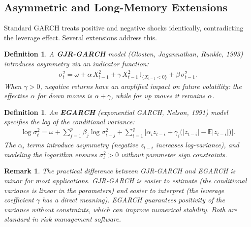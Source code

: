 \documentclass{report}
\theoremstyle{spacedplain}
\theoremstyle{spaceddefinition}
\newtheorem{definition}[theorem]{Definition}
\theoremstyle{spacedremark}
\newtheorem{remark}[theorem]{Remark}
\begin{document}
\subsection{Asymmetric and Long-Memory Extensions}

Standard GARCH treats positive and negative shocks identically, contradicting the leverage effect. Several extensions address this.

\begin{definition}
A \textbf{GJR-GARCH} model (Glosten, Jagannathan, Runkle, 1993) introduces asymmetry via an indicator function:
\begin{align}
    \sigma_t^2 = \omega + \alpha\, X_{t-1}^2 + \gamma\, X_{t-1}^2\, \mathbb{I}_{\{X_{t-1} < 0\}} + \beta\, \sigma_{t-1}^2.
\end{align}
When $\gamma > 0$, negative returns have an amplified impact on future volatility: the effective $\alpha$ for down moves is $\alpha + \gamma$, while for up moves it remains $\alpha$.
\end{definition}

\begin{definition}
An \textbf{EGARCH} (exponential GARCH, Nelson, 1991) model specifies the \emph{log} of the conditional variance:
\begin{align}
    \log \sigma_t^2 = \omega + \sum_{j=1}^p \beta_j \log \sigma_{t-j}^2 + \sum_{i=1}^q \bigl[\alpha_i z_{t-i} + \gamma_i\bigl(|z_{t-i}| - \mathbb{E}|z_{t-i}|\bigr)\bigr].
\end{align}
The $\alpha_i$ terms introduce asymmetry (negative $z_{t-i}$ increases log-variance), and modeling the logarithm ensures $\sigma_t^2 > 0$ without parameter sign constraints.
\end{definition}

\begin{remark}
The practical difference between GJR-GARCH and EGARCH is minor for most applications. GJR-GARCH is easier to estimate (the conditional variance is linear in the parameters) and easier to interpret (the leverage coefficient $\gamma$ has a direct meaning). EGARCH guarantees positivity of the variance without constraints, which can improve numerical stability. Both are standard in risk management software.
\end{remark}
\end{document}
